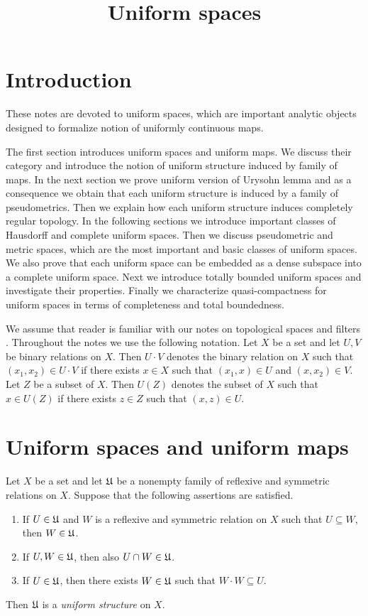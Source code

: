 \documentclass[10pt]{amsart}
\begin{document}
\title{Uniform spaces}
\date{}
\maketitle

\section{Introduction}
\noindent
These notes are devoted to uniform spaces, which are important analytic objects designed to formalize notion of uniformly continuous maps. 

The first section introduces uniform spaces and uniform maps. We discuss their category and introduce the notion of uniform structure induced by family of maps. In the next section we prove uniform version of Urysohn lemma and as a consequence we obtain that each uniform structure is induced by a family of pseudometrics. Then we explain how each uniform structure induces completely regular topology. In the following sections we introduce important classes of Hausdorff and complete uniform spaces. Then we discuss pseudometric and metric spaces, which are the most important and basic classes of uniform spaces. We also prove that each uniform space can be embedded as a dense subspace into a complete uniform space. Next we introduce totally bounded uniform spaces and investigate their properties. Finally we characterize quasi-compactness for uniform spaces in terms of completeness and total boundedness.

We assume that reader is familiar with our notes on topological spaces \cite{Topological_spaces} and filters \cite{Filters_in_topology}. Throughout the notes we use the following notation. Let $X$ be a set and let $U, V$ be binary relations on $X$. Then $U \cdot V$ denotes the binary relation on $X$ such that $(x_1,x_2) \in U\cdot V$ if there exists $x\in X$ such that $(x_1, x)\in U$ and $(x,x_2)\in V$. Let $Z$ be a subset of $X$. Then $U(Z)$ denotes the subset of $X$ such that $x \in U(Z)$ if there exists $z\in Z$ such that $(x, z)\in U$.

\section{Uniform spaces and uniform maps}

\begin{definition}
	Let $X$ be a set and let ${\mathfrak U}$ be a nonempty family of reflexive and symmetric relations on $X$. Suppose that the following assertions are satisfied.
	\begin{enumerate}[label=\textbf{(\arabic*)}, leftmargin=3.0em]
		\item If $U \in {\mathfrak U}$ and $W$ is a reflexive and symmetric relation on $X$ such that $U \subseteq W$, then $W \in {\mathfrak U}$.
		\item If $U,W \in {\mathfrak U}$, then also $U\cap W \in {\mathfrak U}$.
		\item If $U \in {\mathfrak U}$, then there exists $W \in {\mathfrak U}$ such that $W\cdot W \subseteq U$.
	\end{enumerate}
	Then ${\mathfrak U}$ is a \textit{uniform structure} on $X$.
\end{definition}
\end{document}
